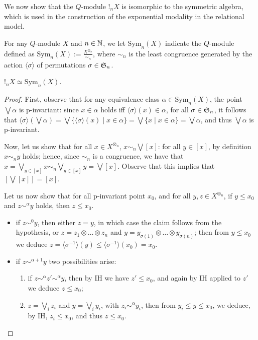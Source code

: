 We now show that the $Q$-module $!_{n}X$ is isomorphic to the symmetric algebra, which is used in the construction of the exponential modality in the relational model.

\begin{definition}
For any $Q$-module $X$ and $n\in \mathbb{N}$, we let $\mathrm{Sym}_{n}(X)$ indicate the $Q$-module defined as 
$\mathrm{Sym}_{n}(X):=\frac{X^{\otimes_{n}}}{\sim_{n}}
$, where $\sim_{n}$ is the least congruence generated by the action $\langle \sigma\rangle$ of permutations $\sigma\in \mathfrak{S}_{n}$.\end{definition}

\begin{proposition}
$!_{n}X\simeq \mathrm{Sym}_{n}(X) $.
\end{proposition}
\begin{proof}
First, observe that for any equivalence class $\alpha\in \mathrm{Sym}_{n}(X)$, the point $\bigvee\alpha$ is p-invariant: 
 since $x\in \alpha$ holds iff $\langle \sigma \rangle (x)\in \alpha$, for all $\sigma\in\mathfrak{S}_{n}$, 
it follows that $\langle \sigma \rangle (\bigvee \alpha)=\bigvee\{\langle \sigma \rangle (x)\mid x\in \alpha\}=\bigvee \{x\mid x\in \alpha\}=\bigvee \alpha$, and thus $\bigvee\alpha$ is p-invariant.




Now, let us show that for all $x\in X^{\otimes_{n}}$, $x \sim_{n} \bigvee[x]$: for all $y\in [x]$, by definition $x\sim_{n}y$ holds; hence, since $\sim_{n}$ is a congruence, we have that 
$x=\bigvee_{y\in[x]}x \sim_{n} \bigvee_{y\in [x]}y=\bigvee[x]$.
Observe that this implies that $[\bigvee[x]]=[x]$.


Let us now show that for all p-invariant point $x_{0}$, and for all $y,z\in X^{\otimes_{n}}$, if 
$y\leq x_{0}$ and 
$z\sim^{\alpha}y$ holds, then $z\leq x_{0}$.
\begin{itemize}
\item if $z\sim^{0} y$, then either $z=y$, in which case the claim follows from the hypothesis, or $z=z_{1}\otimes \dots \otimes z_{n}$ and $y=y_{\sigma(1)}\otimes \dots \otimes y_{\sigma(n)}$; then from $y\leq x_{0}$ we deduce $z=\langle \sigma^{-1} \rangle(y)\leq \langle \sigma^{-1}\rangle(x_{0})=x_{0}$.

\item if $z\sim^{\alpha+1}y$ two possibilities arise:
	\begin{enumerate}
	\item if $z\sim^{\alpha}z'\sim^{\alpha}y$, then by IH we have $z'\leq x_{0}$, and again by IH applied to $z'$ we deduce $z\leq x_{0}$;
	\item $z=\bigvee_{i}z_{i}$ and $y=\bigvee_{i}y_{i}$, with $z_{i}\sim^{\alpha}y_{i}$, then from $y_{i}\leq y\leq x_{0}$, we deduce, by IH, $z_{i}\leq x_{0}$, and thus $z\leq x_{0}$.
	

\end{enumerate}
\end{itemize}
\end{proof}

